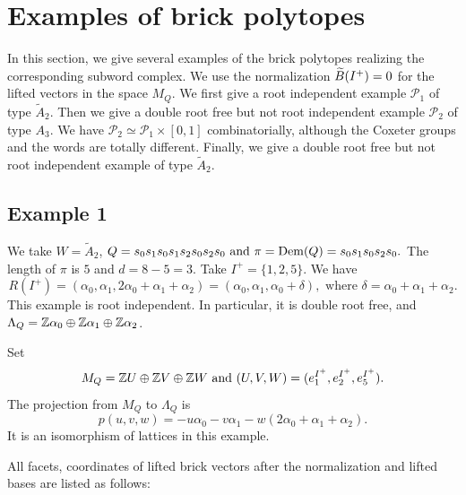 
\section{Examples of brick polytopes}
\label{sec:interleaved-examples}

In this section, we give several examples of the brick polytopes realizing the corresponding subword complex. We use the normalization $\widetilde B(I^+)=0$ for the lifted vectors in the space  $M_Q$. We first give a root independent example $\mathcal P_1$ of type $\widetilde A_2$. Then we give a double root free but not root independent example $\mathcal P_2$ of type $A_3$. We have $\mathcal P_2\simeq \mathcal P_1\times [0,1]$ combinatorially, although the Coxeter groups and the words are totally different. Finally, we give a double root free but not root independent example of type $\widetilde A_2$.


\subsection{Example 1}
\label{ex:int-affine}

We take $W=\widetilde A_2$, $Q=s_0s_1s_0s_1s_2s_0s_2s_0 \text{ and }
\pi=\operatorname{Dem}(Q)=s_0s_1s_0s_2s_0.$
The length of $\pi$ is $5$ and $d=8-5=3$. Take $I^+=\{1,2,5\}$. We have
\[
R(I^+) =(\alpha_0,\alpha_1,2\alpha_0+\alpha_1+\alpha_2)
       =(\alpha_0,\alpha_1,\alpha_0+\delta),
\text{ where } \delta=\alpha_0+\alpha_1+\alpha_2.
\]
This example is root independent. In particular, it is double root
free, and $\Lambda_Q=\mathbb Z\alpha_0\oplus\mathbb Z\alpha_1\oplus\mathbb Z\alpha_2$.

Set
\[
M_Q=\mathbb Z U\oplus\mathbb Z V\oplus\mathbb Z W \text{ and } (U,V,W)=(e_1^{I^+},e_2^{I^+},e_5^{I^+}).
\]
The projection from $M_Q$ to $\Lambda_Q$ is
\begin{equation}\label{eq:int-affine-p}
p(u,v,w)=-u\alpha_0-v\alpha_1-w(2\alpha_0+\alpha_1+\alpha_2).
\end{equation}
It is an isomorphism of lattices in this example.

All facets, coordinates of lifted brick vectors after the normalization and lifted bases are listed as follows:

